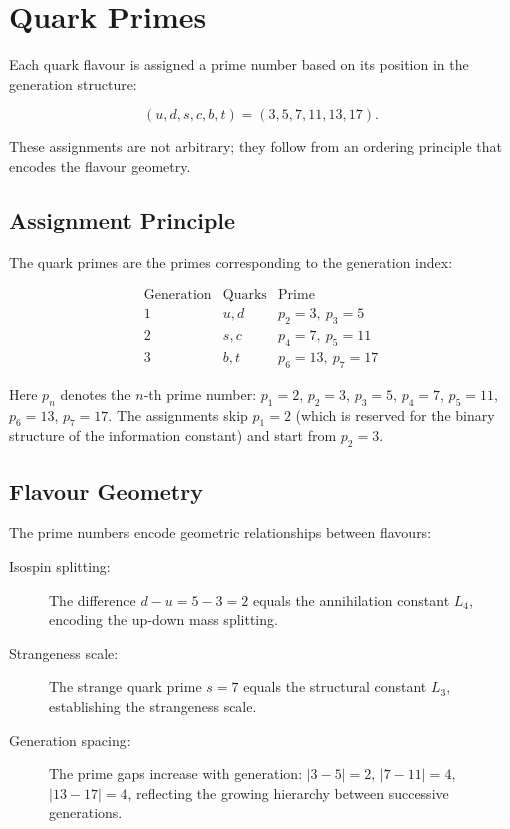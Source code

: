 \chapter{Quark Primes}
\label{ch:quark_primes}

Each quark flavour is assigned a prime number based on its position in
the generation structure:

\begin{equation}
(u,d,s,c,b,t) = (3,5,7,11,13,17).
\label{eq:quark_primes}
\end{equation}

These assignments are not arbitrary; they follow from an ordering principle
that encodes the flavour geometry.

\section{Assignment Principle}

The quark primes are the primes corresponding to the generation index:

\[
\begin{array}{c|c|c}
\text{Generation} & \text{Quarks} & \text{Prime} \\ \hline
1 & u, d & p_2 = 3,\ p_3 = 5 \\
2 & s, c & p_4 = 7,\ p_5 = 11 \\
3 & b, t & p_6 = 13,\ p_7 = 17
\end{array}
\]

Here \(p_n\) denotes the \(n\)-th prime number: \(p_1 = 2\), \(p_2 = 3\),
\(p_3 = 5\), \(p_4 = 7\), \(p_5 = 11\), \(p_6 = 13\), \(p_7 = 17\).
The assignments skip \(p_1 = 2\) (which is reserved for the binary structure
of the information constant) and start from \(p_2 = 3\).

\section{Flavour Geometry}

The prime numbers encode geometric relationships between flavours:

\begin{description}
\item[Isospin splitting:] The difference \(d - u = 5 - 3 = 2\) equals the
annihilation constant \(L_4\), encoding the up-down mass splitting.
\item[Strangeness scale:] The strange quark prime \(s = 7\) equals the
structural constant \(L_3\), establishing the strangeness scale.
\item[Generation spacing:] The prime gaps increase with generation:
\(|3-5| = 2\), \(|7-11| = 4\), \(|13-17| = 4\), reflecting the growing
hierarchy between successive generations.
\end{description}

